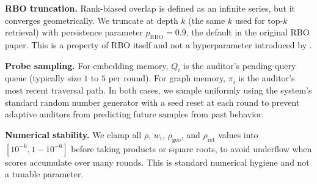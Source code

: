 \textbf{RBO truncation.}
Rank-biased overlap is defined as an infinite series, but it
converges geometrically. We truncate at depth $k$ (the same $k$ used
for top-$k$ retrieval) with persistence parameter $p_{\text{RBO}} =
0.9$, the default in the original RBO paper. This is a property of
RBO itself and not a hyperparameter introduced by \system.

\textbf{Probe sampling.}
For embedding memory, $Q_i$ is the auditor's pending-query queue
(typically size $1$ to $5$ per round). For graph memory, $\pi_i$ is
the auditor's most recent traversal path. In both cases, we sample
uniformly using the system's standard random number generator with a
seed reset at each round to prevent adaptive auditors from predicting
future samples from past behavior.

\textbf{Numerical stability.}
We clamp all $\rho$, $w_i$, $\rho_{\text{geo}}$, and $\rho_{\text{ret}}$
values into $[10^{-6}, 1 - 10^{-6}]$ before taking products or square
roots, to avoid underflow when scores accumulate over many rounds.
This is standard numerical hygiene and not a tunable parameter.
